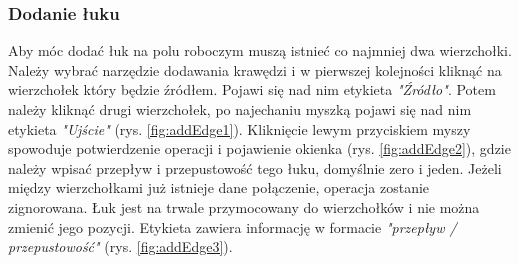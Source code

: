 \subsubsection{Dodanie łuku}
Aby móc dodać łuk na polu roboczym muszą istnieć co najmniej dwa wierzchołki. Należy wybrać narzędzie dodawania krawędzi i w pierwszej kolejności kliknąć na wierzchołek który będzie źródłem. Pojawi się nad nim etykieta \textit{"Źródło"}. Potem należy kliknąć drugi wierzchołek, po najechaniu myszką pojawi się nad nim etykieta \textit{"Ujście"} (rys. \ref{fig:addEdge1}). Kliknięcie lewym przyciskiem myszy spowoduje potwierdzenie operacji i pojawienie okienka (rys. \ref{fig:addEdge2}), gdzie należy wpisać przepływ i przepustowość tego łuku, domyślnie zero i jeden. Jeżeli między wierzchołkami już istnieje dane połączenie, operacja zostanie zignorowana. Łuk jest na trwale przymocowany do wierzchołków i nie można zmienić jego pozycji. Etykieta zawiera informację w formacie \emph{"przepływ / przepustowość"} (rys. \ref{fig:addEdge3}).
